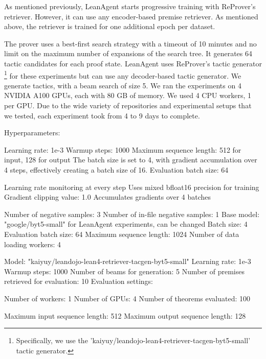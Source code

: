 \documentclass{article} %
\begin{document}
As mentioned previously, LeanAgent starts progressive training with ReProver's retriever. However, it can use any encoder-based premise retriever. As mentioned above, the retriever is trained for one additional epoch per dataset. 

The prover uses a best-first search strategy with a timeout of 10 minutes and no limit on the maximum number of expansions of the search tree. It generates 64 tactic candidates for each proof state. LeanAgent uses ReProver's tactic generator \footnote{Specifically, we use the 'kaiyuy/leandojo-lean4-retriever-tacgen-byt5-small' tactic generator.} for these experiments but can use any decoder-based tactic generator. We generate tactics, with a beam search of size 5. We ran the experiments on 4 NVIDIA A100 GPUs, each with 80 GB of memory. We used 4 CPU workers, 1 per GPU. Due to the wide variety of repositories and experimental setups that we tested, each experiment took from 4 to 9 days to complete.

Hyperparameters:

Learning rate: 1e-3
Warmup steps: 1000
Maximum sequence length: 512 for input, 128 for output
The batch size is set to 4, with gradient accumulation over 4 steps, effectively creating a batch size of 16.
Evaluation batch size: 64

Learning rate monitoring at every step
Uses mixed bfloat16 precision for training
Gradient clipping value: 1.0
Accumulates gradients over 4 batches

Number of negative samples: 3
Number of in-file negative samples: 1
Base model: "google/byt5-small" for LeanAgent experiments, can be changed
Batch size: 4
Evaluation batch size: 64
Maximum sequence length: 1024
Number of data loading workers: 4

Model: "kaiyuy/leandojo-lean4-retriever-tacgen-byt5-small"
Learning rate: 1e-3
Warmup steps: 1000
Number of beams for generation: 5
Number of premises retrieved for evaluation: 10
Evaluation settings:

Number of workers: 1
Number of GPUs: 4
Number of theorems evaluated: 100


Maximum input sequence length: 512
Maximum output sequence length: 128


\end{document}
